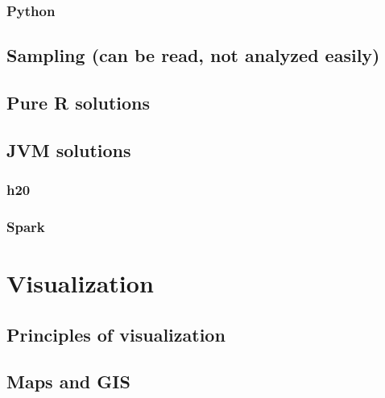 \documentclass[]{book}
\theoremstyle{definition}
\theoremstyle{definition}
\theoremstyle{definition}
\theoremstyle{remark}
\begin{document}
\subsection{Python}\label{python}

\section{Sampling (can be read, not analyzed
easily)}\label{sampling-can-be-read-not-analyzed-easily}

\section{Pure R solutions}\label{pure-r-solutions}

\section{JVM solutions}\label{jvm-solutions}

\subsection{h20}\label{h20}

\subsection{Spark}\label{spark}

\chapter{Visualization}\label{visualization}

\section{Principles of visualization}\label{principles-of-visualization}

\section{Maps and GIS}\label{maps-and-gis}


\end{document}
